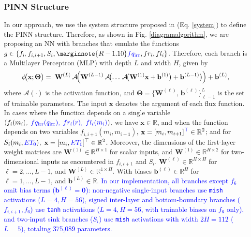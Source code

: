 \documentclass[pdflatex,sn-nature]{sn-jnl}%
\theoremstyle{thmstyleone}%
\theoremstyle{thmstyletwo}%
\theoremstyle{thmstylethree}%
\begin{document}
\subsubsection{PINN Structure}
In our approach, we use the system structure proposed in (Eq. \eqref{system}) to define the PINN structure. Therefore, as shown in Fig. \ref{diagramalgorithm}, we are proposing an NN with branches that emulate the functions \( g \in \{f_i, f_{i,i+1}, S_i, \marginnote{R-1.10}\textcolor{blue}{fq_{\mathrm{irr}}}, fr_i, fl_i\} \). Therefore, each branch is a Multilayer Perceptron (MLP) with depth \( L \) and width \( H \), given by
\begin{equation}
\phi\!\bigl(\mathbf{x}; \boldsymbol{\Theta}\bigr)
  =\;
  \mathbf{W}^{(L)}
  \,\mathcal{A}\!\Bigl(
     \mathbf{W}^{(L-1)}
     \,\mathcal{A}\!\bigl(
        \dots
        \,\mathcal{A}\!\bigl(
           \mathbf{W}^{(1)}\mathbf{x}
           +\mathbf{b}^{(1)}
        \bigr)
        +\mathbf{b}^{(L-1)}
     \bigr)
  \Bigr)
  +\mathbf{b}^{(L)},
\label{eq:mlp}
\end{equation}
where \(\mathcal{A}(\cdot)\) is the activation function, and \(\displaystyle \boldsymbol{\Theta} = \{\mathbf{W}^{(\ell)},\,\mathbf{b}^{(\ell)}\}_{\ell=1}^L\) is the set of trainable parameters. The input \(\mathbf{x}\) denotes the argument of each flux function.
In cases where the function depends on a single variable $\left(f_i(m_i),\;\textcolor{blue}{fq_{\mathrm{irr}}(q_{\mathrm{irr}}),\;fr_i(r),\;fl_i(m_i)}\right)$, we have \(\mathbf{x}\in\mathbb{R}\), and when the function depends on two variables \(f_{i,i+1}(m_i,m_{i+1})\), \(\displaystyle \mathbf{x}=[m_i,m_{i+1}]\textcolor{blue}{^\top}\in\mathbb{R}^2\); and for \(S_i(m_i,\textcolor{blue}{ET_0})\), \(\displaystyle \mathbf{x}=[m_i,\textcolor{blue}{ET_0}]^\top\in\mathbb{R}^2\). Moreover, the dimensions of the first-layer weight matrices are \(\mathbf{W}^{(1)}\in\mathbb{R}^{H\times1}\) for scalar inputs, and \(\mathbf{W}^{(1)}\in\mathbb{R}^{H\times2}\) for two-dimensional inputs as encountered in \(f_{i,i+1}\) and \(S_i\).
\( \mathbf{W}^{(\ell)} \in \mathbb{R}^{H \times H} \) for \( \ell = 2, \dots, L-1 \), and \( \mathbf{W}^{(L)} \in \mathbb{R}^{1 \times H} \). With biases \( \mathbf{b}^{(\ell)} \in \mathbb{R}^{H} \) for \( \ell = 1, \dots, L-1 \), and \( \mathbf{b}^{(L)} \in \mathbb{R} \). \textcolor{blue}{In our implementation, all branches except $f_6$ omit bias terms ($\mathbf{b}^{(\ell)} = \mathbf{0}$): non-negative single-input branches use \texttt{mish} activations ($L=4, H=56$), signed inter-layer and bottom-boundary branches ($f_{i,i+1}, f_6$) use \texttt{tanh} activations ($L=4, H=56$, with trainable biases on $f_6$ only), and two-input sink branches ($S_i$) use \texttt{mish} activations with width $2H=112$ ($L=5$), totaling 375,089 parameters.}
\end{document}
